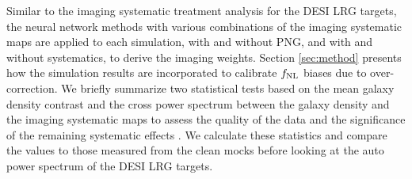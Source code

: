 Similar to the imaging systematic treatment analysis for the DESI LRG targets, the neural network methods with various combinations of the imaging systematic maps are applied to each simulation, with and without PNG, and with and without systematics, to derive the imaging weights. Section \ref{sec:method} presents how the simulation results are incorporated to calibrate $f_{\rm NL}$ biases due to over-correction. We briefly summarize two statistical tests based on the mean galaxy density contrast and the cross power spectrum between the galaxy density and the imaging systematic maps to assess the quality of the data and the significance of the remaining systematic effects \cite[see, also,][]{rezaie2021primordial}. We calculate these statistics and compare the values to those measured from the clean mocks before looking at the auto power spectrum of the DESI LRG targets.